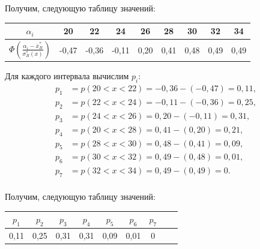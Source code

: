\documentclass[utf8, a4paper, 14pt, russian, oneside]{book}
\begin{document}
Получим, следующую таблицу значений:
\begin{table}[h!]
    \centering
    \begin{tabular}{|c|c|c|c|c|c|c|c|c|}
        \hline
        $\alpha_i$  & 20 & 22 & 24 & 26 & 28 & 30 & 32 & 34\\
        \hline
        $\Phi(\tfrac{\alpha_i - \overline{x}_B^*}{\sigma_B^*(x)})$ & -0,47 & -0,36 & -0,11 & 0,20 & 0,41 & 0,48 & 0,49 & 0,49\\
        \hline
    \end{tabular}
\end{table}

Для каждого интервала вычислим $p_i$:
\begin{align*}
    p_1 &= p(20 < x < 22) = -0,36 - ( -0,47 ) = 0,11, \\
    p_2 &= p(22 < x < 24) = -0,11 - ( -0,36 ) = 0,25, \\
    p_3 &= p(24 < x < 26) =  0,20 - ( -0,11 ) = 0,31, \\
    p_4 &= p(20 < x < 28) =  0,41 - (  0,20 ) = 0,21, \\
    p_5 &= p(28 < x < 30) =  0,48 - (  0,41 ) = 0,09, \\
    p_6 &= p(30 < x < 32) =  0,49 - (  0,48 ) = 0,01, \\
    p_7 &= p(32 < x < 34) =  0,49 - (  0,49 ) = 0. \\
\end{align*}

Получим, следующую таблицу значений:
\begin{table}[h!]
    \centering
    \begin{tabular}{|c|c|c|c|c|c|c|c|c|}
        \hline
        $p_1$ & $p_2$ &$p_3$ &$p_4$ &$p_5$ &$p_6$ &$p_7$ \\
        \hline
        0,11 & 0,25 & 0,31 & 0,31 & 0,09 & 0,01 & 0 \\
        \hline
    \end{tabular}
\end{table}

\newpage

\newpage

\newpage

\newpage

\newpage

\newpage

\newpage

\newpage

\newpage

\newpage

\newpage

\end{document}
